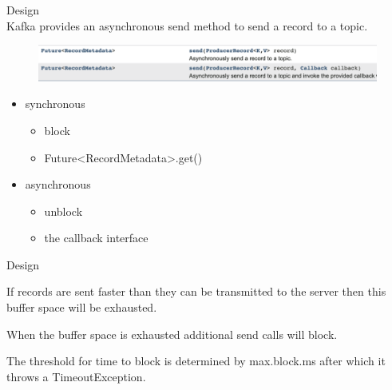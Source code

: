 \begin{frame}[plain,t]{Design} %
     \\
    \vspace{2ex}
    Kafka provides an asynchronous send method to send a record to a topic.
    
    
    \vspace{1ex}
    \begin{figure}
        \centering
        \includegraphics[width=0.9\linewidth]{image/0204}
        \label{fig:0204}
    \end{figure}
    
    
    \begin{itemize}
        \item synchronous
        \begin{itemize}
            \item block
            \item Future<RecordMetadata>.get()
        \end{itemize}
        \item asynchronous
        \begin{itemize}
            \item unblock
            \item the callback interface
        \end{itemize}
    \end{itemize}


\end{frame}
\begin{frame}[plain,t]{Design} %
     \\
    \vspace{2ex}

  
    If records are sent faster than they can be transmitted to the server then this buffer space will be exhausted. 
    
     \vspace{2ex}
    When the buffer space is exhausted additional send calls will block. 
    
     \vspace{2ex}
    The threshold for time to block is determined by max.block.ms after which it throws a TimeoutException.
    
    
    
\end{frame}
